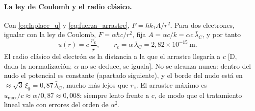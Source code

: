 \documentclass[11pt,a4paper]{article}
\newcommand{\st}[1]{\textup{[#1]}}
\newcommand{\lbar}{\bar{\lambda}}
\newcommand{\apartado}[1]{\paragraph{#1}}
\begin{document}
\apartado{La ley de Coulomb y el radio clásico.} Con \eqref{eq:laplace_u} y \eqref{eq:fuerza_arrastre}, $F=\hbar k_1A/r^2$. Para dos electrones, igualar con la ley de Coulomb, $F=\alpha\hbar c/r^2$, fija $A=\alpha c/k=\alpha c\,\lbar_C$, y por tanto
\begin{equation}
u(r)=c\,\frac{r_e}{r},\qquad r_e=\alpha\,\lbar_C=2,82\times10^{-15}~\mathrm{m} .
\label{eq:arrastre_re}
\end{equation}
El radio clásico del electrón es la distancia a la que el arrastre llegaría a $c$ \st{D, dada la normalización; $\alpha$ no se deduce, se iguala}. No se alcanza nunca: dentro del nudo el potencial es constante (apartado siguiente), y el borde del nudo está en $\approx\sqrt3\,\xi_0=0,87\,\lbar_C$, mucho más lejos que $r_e$. El arrastre máximo es $u_{\max}/c\approx\alpha/0,87\approx0,008$: siempre lento frente a $c$, de modo que el tratamiento lineal vale con errores del orden de $\alpha^2$.
\end{document}
